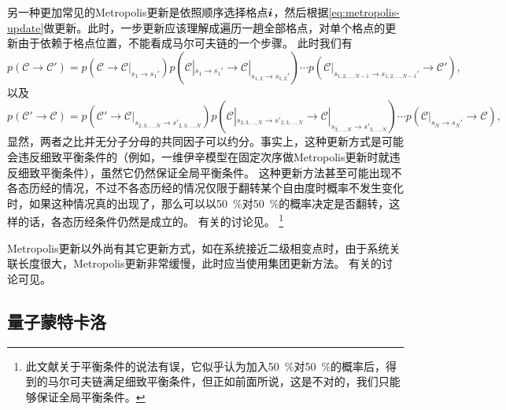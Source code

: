 \documentclass[UTF8]{ctexart}
\begin{document}
另一种更加常见的Metropolis更新是依照顺序选择格点$\vb*{i}$，然后根据\eqref{eq:metropolis-update}做更新。此时，一步更新应该理解成遍历一趟全部格点，对单个格点的更新由于依赖于格点位置，不能看成马尔可夫链的一个步骤。
此时我们有
\begin{equation}
    p(\mathcal{C} \to \mathcal{C}') = p(\mathcal{C} \to \mathcal{C}|_{s_{1} \to s_{1}'}) p(\mathcal{C}|_{s_{1} \to s_{1}'} \to \mathcal{C}|_{s_{1, 2} \to s_{1, 2}'}) \cdots p(\mathcal{C}|_{s_{1, 2, \ldots, N-1} \to s_{1, 2, \ldots, N-1}'} \to \mathcal{C}'),
\end{equation}
以及
\begin{equation}
    p(\mathcal{C}' \to \mathcal{C}) = p(\mathcal{C}' \to \mathcal{C}|_{s_{2, 3, \ldots, N} \to s'_{2, 3, \ldots, N}}) p(\mathcal{C}|_{s_{2, 3, \ldots, N} \to s'_{2, 3, \ldots, N}} \to \mathcal{C}|_{s_{3, \ldots, N} \to s'_{3, \ldots, N}}) \cdots p(\mathcal{C}|_{s_N \to s_{N}'} \to \mathcal{C}),
\end{equation}
显然，两者之比并无分子分母的共同因子可以约分。事实上，这种更新方式是可能会违反细致平衡条件的（例如，一维伊辛模型在固定次序做Metropolis更新时就违反细致平衡条件\cite{manousiouthakis1999strict}），虽然它仍然保证全局平衡条件。
这种更新方法甚至可能出现不各态历经的情况，不过不各态历经的情况仅限于翻转某个自由度时概率不发生变化时，如果这种情况真的出现了，那么可以以\SI{50}{\percent}对\SI{50}{\percent}的概率决定是否翻转，这样的话，各态历经条件仍然是成立的。
有关的讨论见\cite{brugge2021convergence}。%
\footnote{
    此文献关于平衡条件的说法有误，它似乎认为加入\SI{50}{\percent}对\SI{50}{\percent}的概率后，得到的马尔可夫链满足细致平衡条件，但正如前面所说，这是不对的，我们只能够保证全局平衡条件。
}%

Metropolis更新以外尚有其它更新方式，如在系统接近二级相变点时，由于系统关联长度很大，Metropolis更新非常缓慢，此时应当使用集团更新方法。
有关的讨论可见\cite{binder1993monte}。

\subsection{量子蒙特卡洛}
\end{document}

